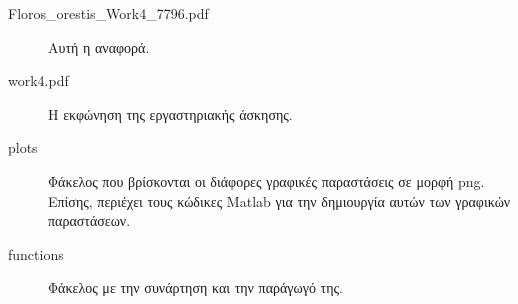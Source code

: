\begin{description}
	\item[Floros\_orestis\_Work4\_7796.pdf] Αυτή η αναφορά.
	\item[work4.pdf] Η εκφώνηση της εργαστηριακής άσκησης.
	\item[plots] Φάκελος που βρίσκονται οι διάφορες γραφικές παραστάσεις σε μορφή png. Επίσης, περιέχει τους κώδικες Matlab για την δημιουργία αυτών των γραφικών παραστάσεων.
	\item[functions] Φάκελος με την συνάρτηση και την παράγωγό της.
\end{description}










